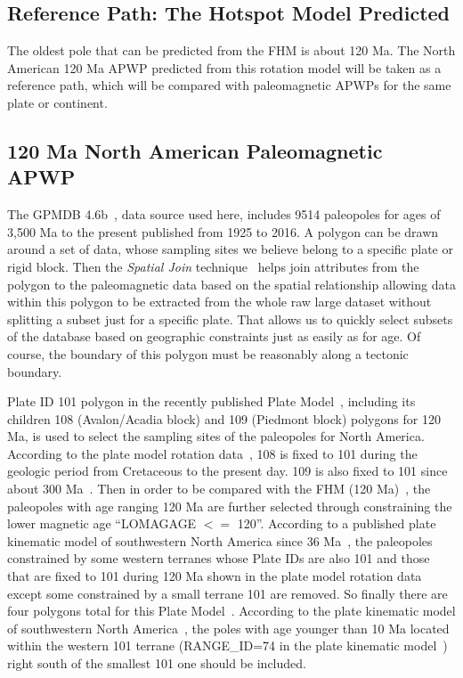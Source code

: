 \subsection{Reference Path: The Hotspot Model Predicted}

The oldest pole that can be predicted from the FHM is about 120 Ma. The North
American 120 Ma APWP predicted from this rotation model will be
taken as a reference path, which will be compared with paleomagnetic APWPs for
the same plate or continent.

\subsection{120 Ma North American Paleomagnetic APWP}

The GPMDB 4.6b~\cite{P05}, data source used here, includes 9514 paleopoles for
ages of 3,500 Ma to the present published from 1925 to 2016. A polygon
can be drawn around a set of data, whose sampling sites we believe belong to a
specific plate or rigid block. Then the {\em Spatial Join\/}
technique~\cite{J07} helps join attributes from the polygon to the paleomagnetic
data based on the spatial relationship allowing data within this polygon to be
extracted from the whole raw large dataset without splitting a subset just for a
specific plate. That allows us to quickly select subsets of the database based
on geographic constraints just as easily as for age. Of course, the boundary of
this polygon must be reasonably along a tectonic boundary.

Plate ID 101 polygon in the recently published Plate Model~\cite{Y18}, including
its children 108 (Avalon/Acadia block) and 109 (Piedmont block) polygons for
120 Ma, is used to select the sampling sites of the paleopoles for
North America. According to the plate model rotation data~\cite{Y18}, 108 is
fixed to 101 during the geologic period from Cretaceous to the present day. 109
is also fixed to 101 since about 300 Ma~\cite{C14}. Then in order to be compared
with the FHM (120 Ma)~\cite{M93,M99}, the paleopoles with age
ranging 120 Ma are further selected through constraining the lower
magnetic age ``LOMAGAGE $<=$ 120''. According to a published plate kinematic model
of southwestern North America since 36 Ma~\cite{Mc06}, the paleopoles
constrained by some western terranes whose Plate IDs are also 101 and those that
are fixed to 101 during 120 Ma shown in the plate model rotation
data~\cite{Y18} except some constrained by a small terrane 101 are removed. So
finally there are four polygons total for this Plate Model~\cite{Y18}. According
to the plate kinematic model of southwestern North America~\cite{Mc06}, the
poles with age younger than 10 Ma located within the western 101 terrane
(RANGE\_ID=74 in the plate kinematic model~\cite{Mc06}) right south of the
smallest 101 one should be included.


